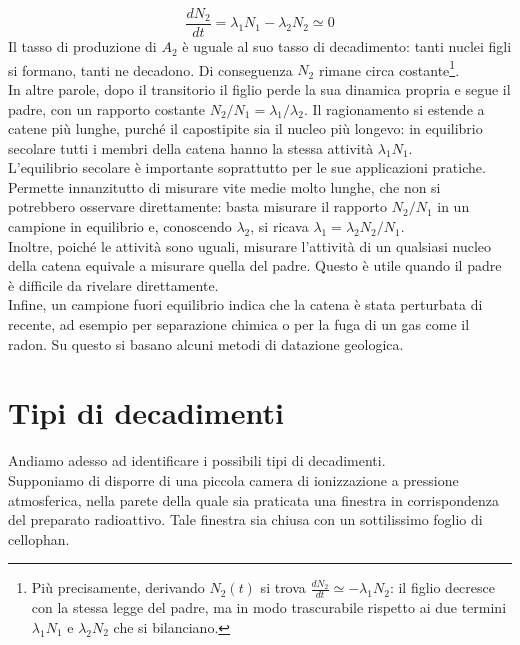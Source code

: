 \begin{equation}
    \frac{dN_2}{dt} = \lambda_1 N_1 - \lambda_2 N_2 \simeq 0
\end{equation}
%
Il tasso di produzione di $A_2$ è uguale al suo tasso di decadimento: tanti nuclei figli si formano, tanti ne decadono. Di conseguenza $N_2$ rimane circa costante\footnote{Più precisamente, derivando $N_2(t)$ si trova $\frac{dN_2}{dt} \simeq -\lambda_1 N_2$: il figlio decresce con la stessa legge del padre, ma in modo trascurabile rispetto ai due termini $\lambda_1 N_1$ e $\lambda_2 N_2$ che si bilanciano.}. \\
In altre parole, dopo il transitorio il figlio perde la sua dinamica propria e segue il padre, con un rapporto costante $N_2/N_1 = \lambda_1/\lambda_2$. Il ragionamento si estende a catene più lunghe, purché il capostipite sia il nucleo più longevo: in equilibrio secolare tutti i membri della catena hanno la stessa attività $\lambda_1 N_1$.\\

L'equilibrio secolare è importante soprattutto per le sue applicazioni pratiche. \\
Permette innanzitutto di misurare vite medie molto lunghe, che non si potrebbero osservare direttamente: basta misurare il rapporto $N_2/N_1$ in un campione in equilibrio e, conoscendo $\lambda_2$, si ricava $\lambda_1 = \lambda_2 N_2/N_1$. \\
Inoltre, poiché le attività sono uguali, misurare l'attività di un qualsiasi nucleo della catena equivale a misurare quella del padre. Questo è utile quando il padre è difficile da rivelare direttamente. \\
Infine, un campione fuori equilibrio indica che la catena è stata perturbata di recente, ad esempio per separazione chimica o per la fuga di un gas come il radon. Su questo si basano alcuni metodi di datazione geologica.

\newpage

\section{Tipi di decadimenti} 

Andiamo adesso ad identificare i possibili tipi di decadimenti. \\

Supponiamo di disporre di una piccola camera di ionizzazione a pressione atmosferica, nella parete della quale sia praticata una finestra in corrispondenza del preparato radioattivo. Tale finestra sia chiusa con un sottilissimo foglio di cellophan.

